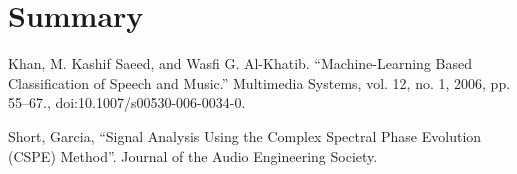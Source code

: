 \documentclass[12pt,letterpaper]{article}
\begin{document}

\section*{Summary}


\begin{thebibliography}{9}


Khan, M. Kashif Saeed, and Wasfi G. Al-Khatib. “Machine-Learning Based Classification of Speech and Music.” Multimedia Systems, vol. 12, no. 1, 2006, pp. 55–67., doi:10.1007/s00530-006-0034-0.

Short, Garcia, “Signal Analysis Using the Complex Spectral Phase Evolution (CSPE) Method”. Journal of the Audio Engineering Society.


\end{thebibliography}

\end{document}
